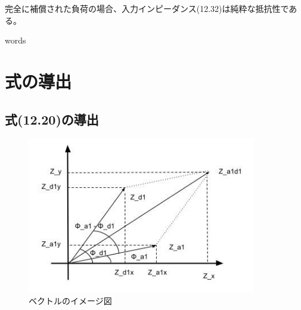\documentclass[fleqn,11pt,a4paper,dvipdfmx]{jsarticle}
\numberwithin{equation}{section}
\begin{document}
完全に補償された負荷の場合、入力インピーダンス(12.32)は純粋な抵抗性である。


\newpage
words

\newpage
\section*{式の導出}
\subsection*{式(12.20)の導出}
\begin{figure}[htbp]
  \begin{center}
    \includegraphics[width=100mm]{./img/vector_Z.jpg}
    \caption{ベクトルのイメージ図}
    \label{vector_Z}
  \end{center}
\end{figure}
\end{document}
